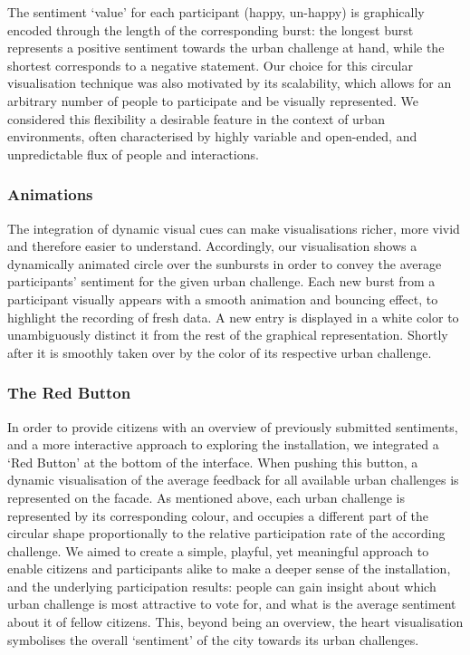 The sentiment ‘value’ for each participant (happy, un-happy) is graphically encoded through the length of the corresponding burst: the longest burst represents a positive sentiment towards the urban challenge at hand, while the shortest corresponds to a negative statement. 
Our choice for this circular visualisation technique was also motivated by its scalability, which allows for an arbitrary number of people to participate and be visually represented. 
We considered this flexibility a desirable feature in the context of urban environments, often characterised by highly variable and open-ended, and unpredictable flux of people and interactions.

\subsubsection*{Animations}

The integration of dynamic visual cues can make visualisations richer, more vivid and therefore easier to understand. 
Accordingly, our visualisation shows a dynamically animated circle over the sunbursts in order to convey the average participants’ sentiment for the given urban challenge. 
Each new burst from a participant visually appears with a smooth animation and bouncing effect, to highlight the recording of fresh data. 
A new entry is displayed in a white color to unambiguously distinct it from the rest of the graphical representation. 
Shortly after it is smoothly taken over by the color of its respective urban challenge.

\subsubsection*{The Red Button}

In order to provide citizens with an overview of previously submitted sentiments, and a more interactive approach to exploring the installation, we integrated a ‘Red Button’ at the bottom of the interface. 
When pushing this button, a dynamic visualisation of the average feedback for all available urban challenges is represented on the facade. 
As mentioned above, each urban challenge is represented by its corresponding colour, and occupies a different part of the circular shape proportionally to the relative participation rate of the according challenge. 
We aimed to create a simple, playful, yet meaningful approach to enable citizens and participants alike to make a deeper sense of the installation, and the underlying participation results: people can gain insight about which urban challenge is most attractive to vote for, and what is the average sentiment about it of fellow citizens. 
This, beyond being an overview, the heart visualisation symbolises the overall ‘sentiment’ of the city towards its urban challenges.

